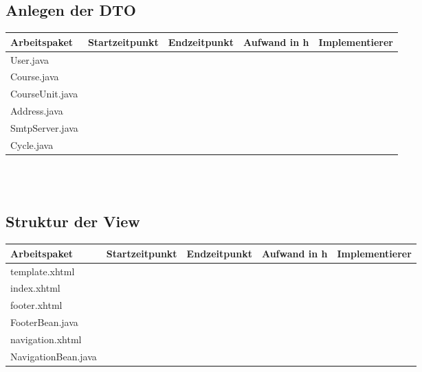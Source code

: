 \begin{landscape}
\subsection{Anlegen der DTO}
\begin{tabular}{|p{10cm}|p{4cm}|p{3cm}|p{3cm}|p{3cm}|}
	\hline  \textbf{Arbeitspaket} & \textbf{Startzeitpunkt} & \textbf{Endzeitpunkt} & \textbf{Aufwand in h} & \textbf{Implementierer} \\ 
	\hline   User.java                        &                            &                             &                     &\\ 
	   Course.java                      &                            &                             &                     &\\ 
	   CourseUnit.java                  &                            &                             &                     &\\ 
	   Address.java                     &                            &                             &                     &\\ 
	   SmtpServer.java                  &                            &                             &                     &\\  
	   Cycle.java                       &                            &                             &                     &\\   
	\hline 
\end{tabular} \ \\
\ \\

\subsection{Struktur der View}
\begin{tabular}{|p{10cm}|p{4cm}|p{3cm}|p{3cm}|p{3cm}|}
	\hline  \textbf{Arbeitspaket} & \textbf{Startzeitpunkt} & \textbf{Endzeitpunkt} & \textbf{Aufwand in h} & \textbf{Implementierer} \\ 
	\hline   template.xhtml                   &                            &                             &                     &\\
	\hline   index.xhtml                      &                            &                             &                     &\\
	\hline   footer.xhtml                     &                            &                             &                     &\\ 
	\hline   FooterBean.java                  &                            &                             &                     &\\ 
	\hline   navigation.xhtml                 &                            &                             &                     &\\ 
	\hline   NavigationBean.java              &                            &                             &                     &\\ 
	\hline 
\end{tabular} \ \\
\ \\


\end{landscape}
